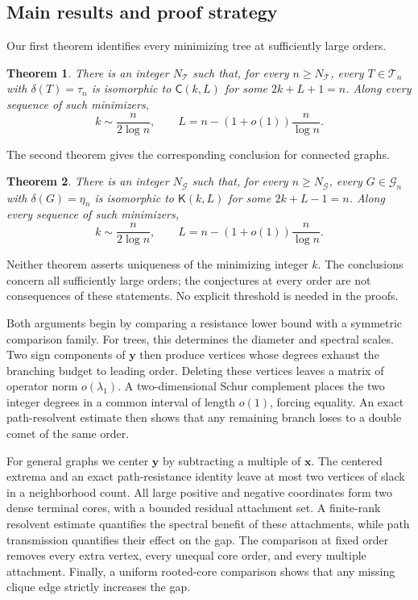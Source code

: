 \documentclass[11pt,a4paper]{article}
\numberwithin{equation}{section}
\newtheorem{theorem}{Theorem}[section]
\theoremstyle{definition}
\theoremstyle{remark}
\newcommand{\Comet}{\mathsf{C}}
\newcommand{\Kite}{\mathsf{K}}
\begin{document}
\subsection{Main results and proof strategy}
Our first theorem identifies every minimizing tree at sufficiently large
orders.
\begin{theorem}\label{thm:trees}
There is an integer $N_{\mathcal T}$ such that, for every $n\ge N_{\mathcal T}$,
every $T\in\mathcal T_n$ with $\delta(T)=\tau_n$ is isomorphic to
$\Comet(k,L)$ for some $2k+L+1=n$. Along every sequence of such minimizers,
\[
 k\sim\frac{n}{2\log n},\qquad
 L=n-(1+o(1))\frac{n}{\log n}.
\]
\end{theorem}
The second theorem gives the corresponding conclusion for connected graphs.
\begin{theorem}\label{thm:graphs}
There is an integer $N_{\mathcal G}$ such that, for every $n\ge N_{\mathcal G}$,
every $G\in\mathcal G_n$ with $\delta(G)=\eta_n$ is isomorphic to
$\Kite(k,L)$ for some $2k+L-1=n$. Along every sequence of such minimizers,
\[
 k\sim\frac{n}{2\log n},\qquad
 L=n-(1+o(1))\frac{n}{\log n}.
\]
\end{theorem}
Neither theorem asserts uniqueness of the minimizing integer $k$. The
conclusions concern all sufficiently large orders; the conjectures at
every order are not consequences of these statements. No explicit
threshold is needed in the proofs.

Both arguments begin by comparing a resistance lower bound with a
symmetric comparison family. For trees, this determines the diameter and
spectral scales. Two sign components of $\mathbf y$ then produce vertices
whose degrees exhaust the branching budget to leading order. Deleting
these vertices leaves a matrix of operator norm $o(\lambda_1)$. A two-dimensional
Schur complement places the two integer degrees in a common interval of
length $o(1)$, forcing equality. An exact path-resolvent estimate then
shows that any remaining branch loses to a double comet of the same order.

For general graphs we center $\mathbf y$ by subtracting a multiple of
$\mathbf x$. The centered extrema and an exact path-resistance identity
leave at most two vertices of slack in a neighborhood count. All large
positive and negative coordinates form two dense terminal cores, with a
bounded residual attachment set. A finite-rank resolvent estimate
quantifies the spectral benefit of these attachments, while path
transmission quantifies their effect on the gap. The comparison at fixed
order removes every extra vertex, every unequal core order, and every
multiple attachment. Finally, a uniform rooted-core comparison shows
that any missing clique edge strictly increases the gap.
\end{document}
